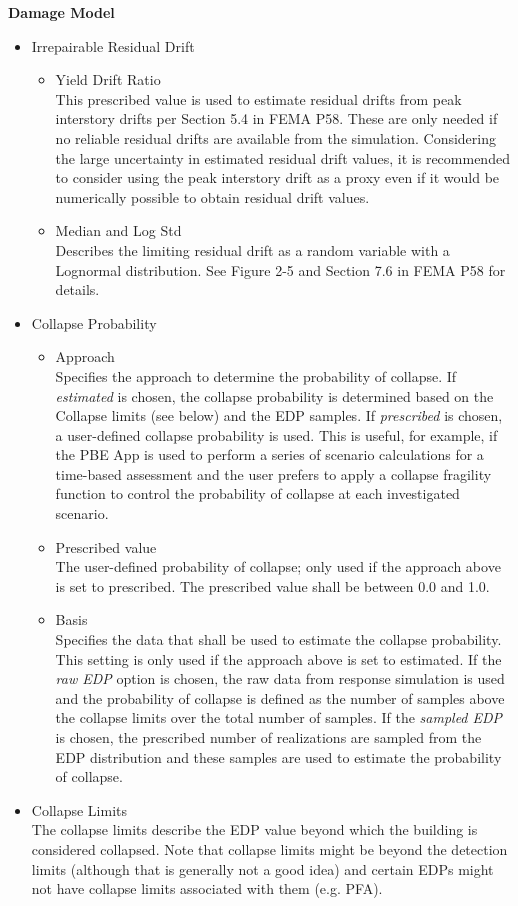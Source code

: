 \textbf{Damage Model}

\begin{itemize}
    \item Irrepairable Residual Drift
    \begin{itemize}
        \item Yield Drift Ratio\\
        This prescribed value is used to estimate residual drifts from peak interstory drifts per Section 5.4 in FEMA P58. These are only needed if no reliable residual drifts are available from the simulation. Considering the large uncertainty in estimated residual drift values, it is recommended to consider using the peak interstory drift as a proxy even if it would be numerically possible to obtain residual drift values.
        \item Median and Log Std\\
        Describes the limiting residual drift as a random variable with a Lognormal distribution. See Figure 2-5 and Section 7.6 in FEMA P58 for details.
    \end{itemize}
    \item Collapse Probability
    \begin{itemize}
        \item Approach\\
        Specifies the approach to determine the probability of collapse. If \textit{estimated} is chosen, the collapse probability is determined based on the Collapse limits (see below) and the EDP samples. If \textit{prescribed} is chosen, a user-defined collapse probability is used. This is useful, for example, if the PBE App is used to perform a series of scenario calculations for a time-based assessment and the user prefers to apply a collapse fragility function to control the probability of collapse at each investigated scenario.
        \item Prescribed value\\
        The user-defined probability of collapse; only used if the approach above is set to prescribed. The prescribed value shall be between 0.0 and 1.0.
        \item Basis\\
        Specifies the data that shall be used to estimate the collapse probability. This setting is only used if the approach above is set to estimated. If the \textit{raw EDP} option is chosen, the raw data from response simulation is used and the probability of collapse is defined as the number of samples above the collapse limits over the total number of samples. If the \textit{sampled EDP} is chosen, the prescribed number of realizations are sampled from the EDP distribution and these samples are used to estimate the probability of collapse.
    \end{itemize}
    \item Collapse Limits\\
    The collapse limits describe the EDP value beyond which the building is considered collapsed. Note that collapse limits might be beyond the detection limits (although that is generally not a good idea) and certain EDPs might not have collapse limits associated with them (e.g. PFA).
\end{itemize}

